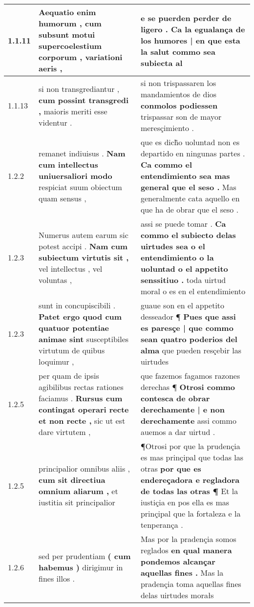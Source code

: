 \begin{tabular}{|p{1cm}|p{6.5cm}|p{6.5cm}|}
1.1.11 & Aequatio enim humorum , \textbf{ cum subsunt motui supercoelestium corporum , } variationi aeris , & e se puerden perder de ligero . \textbf{ Ca la egualança de los humores | en que esta la salut } commo sea subiecta al \\\hline
1.1.13 & si non transgrediantur , \textbf{ cum possint transgredi , } maioris meriti esse videntur . & si non trispassaren los mandamientos de dios \textbf{ conmolos podiessen } trispassar son de mayor meresçimiento . \\\hline
1.2.2 & remanet indiuisus . \textbf{ Nam cum intellectus uniuersaliori modo } respiciat suum obiectum quam sensus , & que es dich̃o uoluntad non es departido en ningunas partes . \textbf{ Ca commo el entendimiento sea mas general que el seso . } Mas generalmente cata aquello en que ha de obrar que el seso . \\\hline
1.2.3 & Numerus autem earum sic potest accipi . \textbf{ Nam cum subiectum virtutis sit , } vel intellectus , vel voluntas , & assi se puede tomar . \textbf{ Ca commo el subiecto delas uirtudes sea o el entendimiento o la uoluntad o el appetito senssitiuo . } toda uirtud moral o es en el entendimiento \\\hline
1.2.3 & sunt in concupiscibili . \textbf{ Patet ergo quod cum quatuor potentiae animae sint } susceptibiles virtutum de quibus loquimur , & guaue son en el appetito desseador ¶ \textbf{ Pues que assi es paresçe | que commo sean quatro poderios del alma } que pueden resçebir las uirtudes \\\hline
1.2.5 & per quam de ipsis agibilibus rectas rationes faciamus . \textbf{ Rursus cum contingat operari recte et non recte , } sic ut est dare virtutem , & que fazemos fagamos razones derechas ¶ \textbf{ Otrosi commo contesca de obrar derechamente | e non derechamente } assi commo auemos a dar uirtud . \\\hline
1.2.5 & principalior omnibus aliis , \textbf{ cum sit directiua omnium aliarum , } et iustitia sit principalior & ¶Otrosi por que la prudençia es mas prinçipal que todas las otras \textbf{ por que es endereçadora e regladora de todas las otras ¶ } Et la iustiçia en pos ella es mas prinçipal que la fortaleza e la tenperança . \\\hline
1.2.6 & sed per prudentiam \textbf{ ( cum habemus ) } dirigimur in fines illos . & Mas por la pradençia somos reglados \textbf{ en qual manera pondemos alcançar aquellas fines . } Mas la pradençia toma aquellas fines delas uirtudes morałs \\\hline

\end{tabular}
